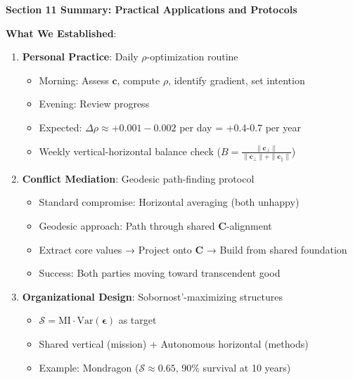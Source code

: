 \documentclass[11pt,a4paper]{article}
\theoremstyle{definition}
\theoremstyle{remark}
\newcommand{\cc}{\mathbf{c}}
\begin{document}
\begin{enumerate}
\begin{mdframed}[backgroundcolor=green!10,linewidth=2pt,linecolor=green!70!black]
\textbf{Section 11 Summary: Practical Applications and Protocols}

\textbf{What We Established}:
\begin{enumerate}[nosep]
    \item \textbf{Personal Practice}: Daily \(\rho\)-optimization routine
        \begin{itemize}[nosep]
            \item Morning: Assess \(\cc\), compute \(\rho\), identify gradient, set intention
            \item Evening: Review progress
            \item Expected: \(\Delta\rho \approx +0.001-0.002\) per day = +0.4-0.7 per year
            \item Weekly vertical-horizontal balance check (\(B = \frac{\|\cc_\perp\|}{\|\cc_\perp\| + \|\cc_\parallel\|}\))
        \end{itemize}
    
    \item \textbf{Conflict Mediation}: Geodesic path-finding protocol
        \begin{itemize}[nosep]
            \item Standard compromise: Horizontal averaging (both unhappy)
            \item Geodesic approach: Path through shared \(\mathbf{C}\)-alignment
            \item Extract core values → Project onto \(\mathbf{C}\) → Build from shared foundation
            \item Success: Both parties moving toward transcendent good
        \end{itemize}
    
    \item \textbf{Organizational Design}: Sobornost'-maximizing structures
        \begin{itemize}[nosep]
            \item \(\mathcal{S} = \text{MI} \cdot \text{Var}(\boldsymbol{\epsilon})\) as target
            \item Shared vertical (mission) + Autonomous horizontal (methods)
            \item Example: Mondragon (\(\mathcal{S} \approx 0.65\), 90\% survival at 10 years)
        \end{itemize}
    

\end{enumerate}
\end{mdframed}
\end{enumerate}
\end{document}
